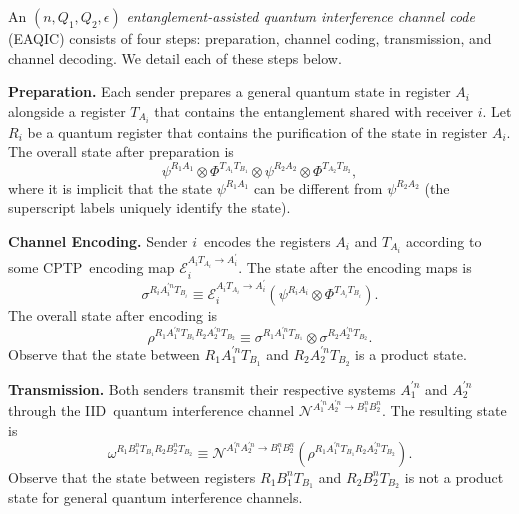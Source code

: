 \documentclass[aps,11pt,twoside,letterpaper]{article}
\begin{document}
		An $(n,Q_{1},Q_{2},\epsilon)$ \textit{entanglement-assisted quantum
		interference channel code} (EAQIC) consists of four steps: preparation,
		channel coding, transmission, and channel decoding. We detail each of these
		steps below.

		\textbf{Preparation.} Each sender prepares a general quantum state in register
		$A_{i}$ alongside a register $T_{A_{i}}$ that contains the entanglement shared
		with receiver $i$. Let $R_{i}$ be a quantum register that contains the
		purification of the state in register $A_{i}$. The overall state after
		preparation is%
		\[
		\psi^{R_{1}A_{1}}\otimes\Phi^{T_{A_{1}}T_{B_{1}}}\otimes\psi^{R_{2}A_{2}%
		}\otimes\Phi^{T_{A_{2}}T_{B_{2}}},
		\]
		where it is implicit that the state $\psi^{R_{1}A_{1}}$ can be different from
		$\psi^{R_{2}A_{2}}$ (the superscript labels uniquely identify the state).

		\textbf{Channel Encoding.} Sender $i$\ encodes the registers $A_{i}$ and
		$T_{A_{i}}$ according to some CPTP\ encoding map $\mathcal{E}_{i}%
		^{A_{i}T_{A_{i}}\rightarrow A_{i}^{\prime}}$. The state after the encoding
		maps is%
		\[
		\sigma^{R_{i}A_{i}^{\prime n}T_{B_{i}}}\equiv\mathcal{E}_{i}^{A_{i}T_{A_{i}%
		}\rightarrow A_{i}^{\prime}}(\psi^{R_{i}A_{i}}\otimes\Phi^{T_{A_{i}}T_{B_{i}}%
		}).
		\]
		The overall state after encoding is%
		\[
		\rho^{R_{1}A_{1}^{\prime n}T_{B_{1}}R_{2}A_{2}^{\prime n}T_{B_{2}}}%
		\equiv\sigma^{R_{1}A_{1}^{\prime n}T_{B_{1}}}\otimes\sigma^{R_{2}A_{2}^{\prime
		n}T_{B_{2}}}.
		\]
		Observe that the state between $R_{1}A_{1}^{\prime n}T_{B_{1}}$ and
		$R_{2}A_{2}^{\prime n}T_{B_{2}}$ is a product state.

		\textbf{Transmission.} Both senders transmit their respective systems
		$A_{1}^{\prime n}$ and $A_{2}^{\prime n}$ through the IID\ quantum
		interference channel $\mathcal{N}^{A_{1}^{\prime n}A_{2}^{\prime n}\rightarrow
		B_{1}^{n}B_{2}^{n}}$. The resulting state is%
		\[
		\omega^{R_{1}B_{1}^{n}T_{B_{1}}R_{2}B_{2}^{n}T_{B_{2}}}\equiv\mathcal{N}%
		^{A_{1}^{\prime n}A_{2}^{\prime n}\rightarrow B_{1}^{n}B_{2}^{n}}(\rho
		^{R_{1}A_{1}^{\prime n}T_{B_{1}}R_{2}A_{2}^{\prime n}T_{B_{2}}}).
		\]
		Observe that the state between registers $R_{1}B_{1}^{n}T_{B_{1}}$ and
		$R_{2}B_{2}^{n}T_{B_{2}}$ is not a product state for general quantum
		interference channels.
\end{document}
